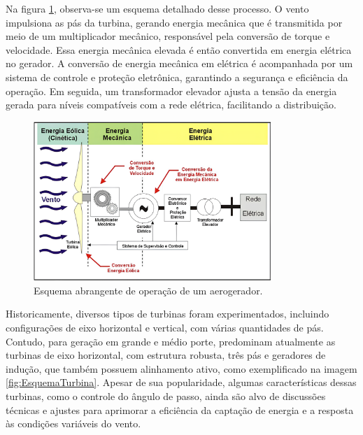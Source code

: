 \par Na figura \ref{fig:EsquemaAbregenteOperacao}, observa-se um esquema detalhado desse processo. O vento impulsiona as pás da turbina, gerando energia mecânica que é transmitida por meio de um multiplicador mecânico, responsável pela conversão de torque e velocidade. Essa energia mecânica elevada é então convertida em energia elétrica no gerador. A conversão de energia mecânica em elétrica é acompanhada por um sistema de controle e proteção eletrônica, garantindo a segurança e eficiência da operação. Em seguida, um transformador elevador ajusta a tensão da energia gerada para níveis compatíveis com a rede elétrica, facilitando a distribuição.

    \begin{figure}[H]
        \caption{Esquema abrangente de operação de um aerogerador.}
        \label{fig:EsquemaAbregenteOperacao}
        \centering
        \includegraphics[width=0.8\textwidth]{Figuras/Teorico/Esquema geral de funcionamento de um aerogerador.png}
    \end{figure}

\par Historicamente, diversos tipos de turbinas foram experimentados, incluindo configurações de eixo horizontal e vertical, com várias quantidades de pás. Contudo, para geração em grande e médio porte, predominam atualmente as turbinas de eixo horizontal, com estrutura robusta, três pás e geradores de indução, que também possuem alinhamento ativo, como exemplificado na imagem \ref{fig:EsquemaTurbina}. Apesar de sua popularidade, algumas características dessas turbinas, como o controle do ângulo de passo, ainda são alvo de discussões técnicas e ajustes para aprimorar a eficiência da captação de energia e a resposta às condições variáveis do vento.

